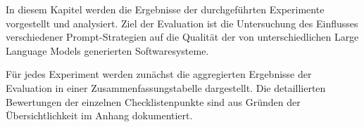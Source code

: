 
In diesem Kapitel werden die Ergebnisse der durchgeführten Experimente vorgestellt und analysiert. Ziel der Evaluation ist die Untersuchung des Einflusses verschiedener Prompt-Strategien auf die Qualität der von unterschiedlichen Large Language Models generierten Softwaresysteme.

Für jedes Experiment werden zunächst die aggregierten Ergebnisse der Evaluation in einer Zusammenfassungstabelle dargestellt. Die detaillierten Bewertungen der einzelnen Checklistenpunkte sind aus Gründen der Übersichtlichkeit im Anhang dokumentiert.
